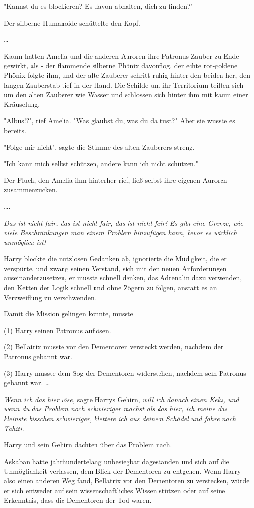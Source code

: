 {"Kannst du es blockieren? Es davon abhalten, dich zu finden?"

Der silberne Humanoide schüttelte den Kopf.

…

Kaum hatten Amelia und die anderen Auroren ihre Patronus-Zauber zu Ende gewirkt, als - der flammende silberne Phönix davonflog, der echte rot-goldene Phönix folgte ihm, und der alte Zauberer schritt ruhig hinter den beiden her, den langen Zauberstab tief in der Hand. Die Schilde um ihr Territorium teilten sich um den alten Zauberer wie Wasser und schlossen sich hinter ihm mit kaum einer Kräuselung.

"Albus!?", rief Amelia. "Was glaubst du, was du da tust?" Aber sie wusste es bereits.

"Folge mir nicht", sagte die Stimme des alten Zauberers streng.

"Ich kann mich selbst schützen, andere kann ich nicht schützen."

Der Fluch, den Amelia ihm hinterher rief, ließ selbst ihre eigenen Auroren zusammenzucken.

….

\emph{Das ist nicht fair, das ist nicht fair, das ist nicht fair! Es gibt eine Grenze, wie viele Beschränkungen man einem Problem hinzufügen kann, bevor es wirklich unmöglich ist!}

Harry blockte die nutzlosen Gedanken ab, ignorierte die Müdigkeit, die er verspürte, und zwang seinen Verstand, sich mit den neuen Anforderungen auseinanderzusetzen, er musste schnell denken, das Adrenalin dazu verwenden, den Ketten der Logik schnell und ohne Zögern zu folgen, anstatt es an Verzweiflung zu verschwenden.

Damit die Mission gelingen konnte, musste

(1) Harry seinen Patronus auflösen.

(2) Bellatrix musste vor den Dementoren versteckt werden, nachdem der Patronus gebannt war.

(3) Harry musste dem Sog der Dementoren widerstehen, nachdem sein Patronus gebannt war. …

\emph{Wenn ich das hier löse,} sagte Harrys Gehirn, \emph{will ich danach einen Keks, und wenn du das Problem noch schwieriger machst als das hier, ich meine das kleinste bisschen schwieriger, klettere ich aus deinem Schädel und fahre nach Tahiti.}

Harry und sein Gehirn dachten über das Problem nach.

Askaban hatte jahrhundertelang unbesiegbar dagestanden und sich auf die Unmöglichkeit verlassen, dem Blick der Dementoren zu entgehen. Wenn Harry also einen anderen Weg fand, Bellatrix vor den Dementoren zu verstecken, würde er sich entweder auf sein wissenschaftliches Wissen stützen oder auf seine Erkenntnis, dass die Dementoren der Tod waren.

}
